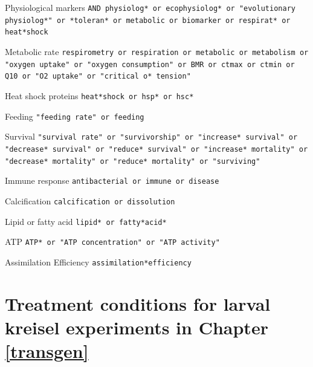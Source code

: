 \documentclass[a4paper,10pt, oneside]{memoir}
\begin{document}
\begin{cipher}{Physiological markers}
\texttt{AND physiolog* or ecophysiolog* or "evolutionary physiolog*" or *toleran* or metabolic or biomarker or respirat* or heat*shock}
\end{cipher}

\begin{cipher}{Metabolic rate}
\texttt{respirometry or respiration or metabolic or metabolism or "oxygen uptake" or "oxygen consumption" or BMR or ctmax or ctmin or Q10 or "O2 uptake" or "critical o* tension"}
\end{cipher}

\begin{cipher}{Heat shock proteins}
\texttt{heat*shock or hsp* or hsc*}
\end{cipher}

\begin{cipher}{Feeding}
\texttt{"feeding rate" or feeding}
\end{cipher}

\begin{cipher}{Survival}
\texttt{"survival rate" or "survivorship" or "increase* survival" or "decrease* survival" or "reduce* survival" or "increase* mortality" or "decrease* mortality" or "reduce* mortality" or "surviving"}
\end{cipher}

\begin{cipher}{Immune response}
\texttt{antibacterial or immune or disease}
\end{cipher}

\begin{cipher}{Calcification}
\texttt{calcification or dissolution}
\end{cipher}

\begin{cipher}{Lipid or fatty acid}
\texttt{lipid* or fatty*acid*}
\end{cipher}

\begin{cipher}{ATP}
\texttt{ATP* or "ATP concentration" or "ATP activity"}
\end{cipher}

\begin{cipher}{Assimilation Efficiency}
\texttt{assimilation*efficiency}
\end{cipher}

\hypertarget{appendixb}{%
\chapter{Treatment conditions for larval kreisel experiments in Chapter \ref{transgen}}\label{appendixb}}
\end{document}
